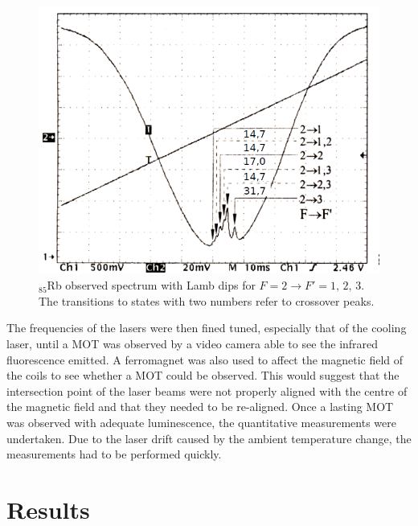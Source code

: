 \documentclass[twocolumn]{article}
\begin{document}
\begin{figure} [!h]
	\centering
	\includegraphics[width=1\linewidth]{Images/Peak1.png}
	\caption{$_{85}$Rb observed spectrum with Lamb dips for $F = 2 \rightarrow F' = 1, \, 2, \, 3$. The transitions to states with two numbers refer to crossover peaks.\cite{manual}}
	\label{fig:Peaks1}
\end{figure}
The frequencies of the lasers were then fined tuned, especially that of the cooling laser, until a MOT was observed by a video camera able to see the infrared fluorescence emitted. A ferromagnet was also used to affect the magnetic field of the coils to see whether a MOT could be observed. This would suggest that the intersection point of the laser beams were not properly aligned with the centre of the magnetic field and that they needed to be re-aligned. Once a lasting MOT was observed with adequate luminescence, the quantitative measurements were undertaken. Due to the laser drift caused by the ambient temperature change, the measurements had to be performed quickly.

\section{Results}
\end{document}
